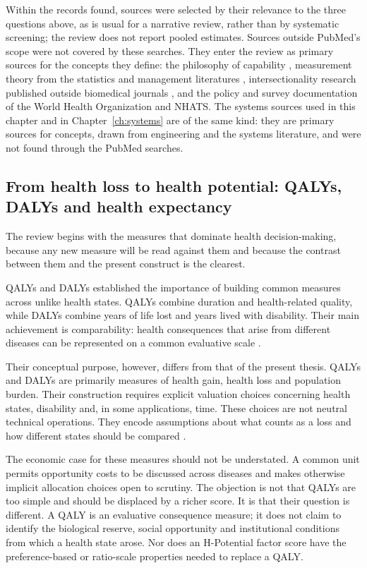 Within the records found, sources were selected by their relevance to the three questions above, as is usual for a narrative review, rather than by systematic screening; the review does not report pooled estimates. Sources outside PubMed's scope were not covered by these searches. They enter the review as primary sources for the concepts they define: the philosophy of capability \citep{sen_1993}, measurement theory from the statistics and management literatures \citep{bollen_lennox_1991,jarvis_2003}, intersectionality research published outside biomedical journals \citep{bowleg_2008}, and the policy and survey documentation of the World Health Organization and NHATS. The systems sources used in this chapter and in Chapter~\ref{ch:systems} are of the same kind: they are primary sources for concepts, drawn from engineering and the systems literature, and were not found through the PubMed searches.

\subsection{From health loss to health potential: QALYs, DALYs and health expectancy}

The review begins with the measures that dominate health decision-making, because any new measure will be read against them and because the contrast between them and the present construct is the clearest.

QALYs and DALYs established the importance of building common measures across unlike health states. QALYs combine duration and health-related quality, while DALYs combine years of life lost and years lived with disability. Their main achievement is comparability: health consequences that arise from different diseases can be represented on a common evaluative scale \citep{whitehead_2010,drummond2015,sundmacher_2017}.

Their conceptual purpose, however, differs from that of the present thesis. QALYs and DALYs are primarily measures of health gain, health loss and population burden. Their construction requires explicit valuation choices concerning health states, disability and, in some applications, time. These choices are not neutral technical operations. They encode assumptions about what counts as a loss and how different states should be compared \citep{drummond2015}.

The economic case for these measures should not be understated. A common unit
permits opportunity costs to be discussed across diseases and makes otherwise
implicit allocation choices open to scrutiny. The objection is not that QALYs
are too simple and should be displaced by a richer score. It is that their
question is different. A QALY is an evaluative consequence measure; it does not
claim to identify the biological reserve, social opportunity and institutional
conditions from which a health state arose. Nor does an H-Potential factor score
have the preference-based or ratio-scale properties needed to replace a QALY.

